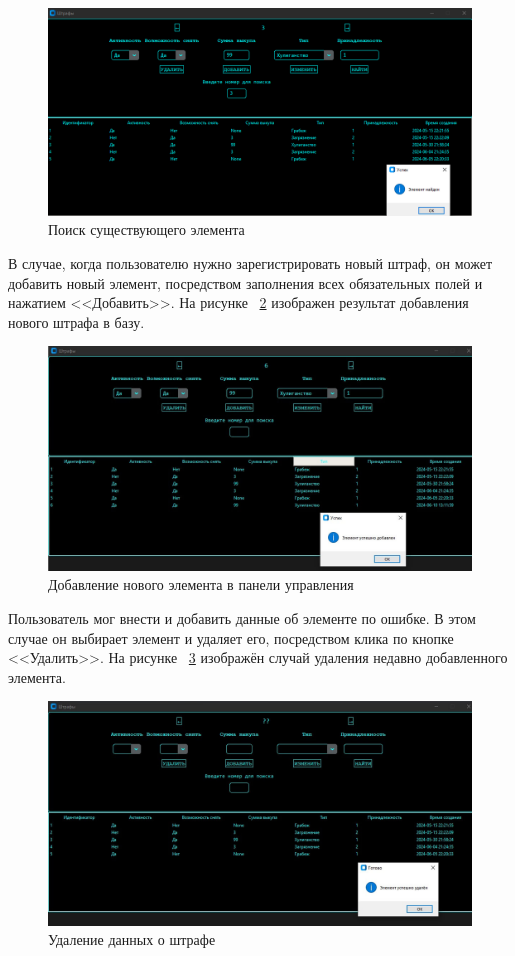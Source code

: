 \begin{figure}[ht]
	\centering
	\includegraphics[width=1\linewidth]{images/Example7}
	\caption{Поиск существующего элемента}
	\label{fig:example7}
\end{figure}
В случае, когда пользователю нужно зарегистрировать новый штраф, он может добавить новый элемент, посредством заполнения всех обязательных полей и нажатием <<Добавить>>. На рисунке ~\ref{fig:example8} изображен результат добавления нового штрафа в базу.
\begin{figure}[ht]
	\centering
	\includegraphics[width=1\linewidth]{images/Example8}
	\caption{Добавление нового элемента в панели управления}
	\label{fig:example8}
\end{figure}
Пользователь мог внести и добавить данные об элементе по ошибке. В этом случае он выбирает элемент и удаляет его, посредством клика по кнопке <<Удалить>>.
На рисунке ~\ref{fig:example9} изображён случай удаления недавно добавленного элемента.
\begin{figure}[ht]
	\centering
	\includegraphics[width=1\linewidth]{images/Example9}
	\caption{Удаление данных о штрафе}
	\label{fig:example9}
\end{figure}

